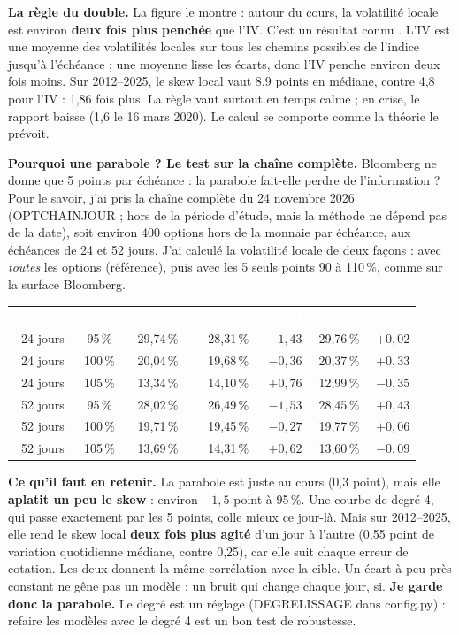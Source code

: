 \documentclass[10pt,a4paper]{article}
\newcommand{\entete}[1]{\textcolor{white}{\bfseries #1}}
\newcommand{\coupure}{\textunderscore\allowbreak}
\newcommand{\fic}[1]{{\small\ttfamily\let\_\coupure #1}}
\begin{document}
\textbf{La règle du double.} La figure le montre : autour du cours, la volatilité locale est environ \textbf{deux fois plus penchée} que l'IV. C'est un résultat connu \cite{gatheral}. L'IV est une moyenne des volatilités locales sur tous les chemins possibles de l'indice jusqu'à l'échéance ; une moyenne lisse les écarts, donc l'IV penche environ deux fois moins. Sur 2012–2025, le skew local vaut 8,9 points en médiane, contre 4,8 pour l'IV : 1,86 fois plus. La règle vaut surtout en temps calme ; en crise, le rapport baisse (1,6 le 16 mars 2020). Le calcul se comporte comme la théorie le prévoit.

\textbf{Pourquoi une parabole ? Le test sur la chaîne complète.} Bloomberg ne donne que 5 points par échéance : la parabole fait-elle perdre de l'information ? Pour le savoir, j'ai pris la chaîne complète du 24 novembre 2026 (\fic{OPT\_CHAIN\_JOUR} ; hors de la période d'étude, mais la méthode ne dépend pas de la date), soit environ 400 options hors de la monnaie par échéance, aux échéances de 24 et 52 jours. J'ai calculé la volatilité locale de deux façons : avec \emph{toutes} les options (référence), puis avec les 5 seuls points 90 à 110\,\%, comme sur la surface Bloomberg.

{\small
\begin{center}
\begin{tabular}{@{}c c c c c c c@{}}
\rowcolor{marine}\entete{Échéance} & \entete{$K/F$} & \entete{Référence} & \entete{Parabole} & \entete{Écart} & \entete{Degré 4} & \entete{Écart} \\
24 jours & 95\,\% & 29,74\,\% & 28,31\,\% & $-1{,}43$ & 29,76\,\% & $+0{,}02$ \\
\rowcolor{gris}24 jours & 100\,\% & 20,04\,\% & 19,68\,\% & $-0{,}36$ & 20,37\,\% & $+0{,}33$ \\
24 jours & 105\,\% & 13,34\,\% & 14,10\,\% & $+0{,}76$ & 12,99\,\% & $-0{,}35$ \\
\rowcolor{gris}52 jours & 95\,\% & 28,02\,\% & 26,49\,\% & $-1{,}53$ & 28,45\,\% & $+0{,}43$ \\
52 jours & 100\,\% & 19,71\,\% & 19,45\,\% & $-0{,}27$ & 19,77\,\% & $+0{,}06$ \\
\rowcolor{gris}52 jours & 105\,\% & 13,69\,\% & 14,31\,\% & $+0{,}62$ & 13,60\,\% & $-0{,}09$ \\
\end{tabular}
\end{center}}
\textbf{Ce qu'il faut en retenir.} La parabole est juste au cours (0,3 point), mais elle \textbf{aplatit un peu le skew} : environ $-1{,}5$ point à 95\,\%. Une courbe de degré 4, qui passe exactement par les 5 points, colle mieux ce jour-là. Mais sur 2012–2025, elle rend le skew local \textbf{deux fois plus agité} d'un jour à l'autre (0,55 point de variation quotidienne médiane, contre 0,25), car elle suit chaque erreur de cotation. Les deux donnent la même corrélation avec la cible. Un écart à peu près constant ne gêne pas un modèle ; un bruit qui change chaque jour, si. \textbf{Je garde donc la parabole.} Le degré est un réglage (\fic{DEGRE\_LISSAGE} dans \fic{config.py}) : refaire les modèles avec le degré 4 est un bon test de robustesse.
\end{document}
